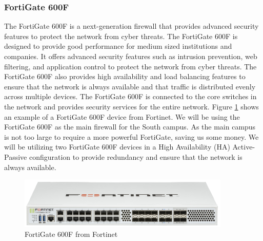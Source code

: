\documentclass[12pt]{report}
\begin{document}
\subsubsection{FortiGate 600F}
The FortiGate 600F is a next-generation firewall that provides advanced security features to protect the network from cyber threats. The FortiGate 600F is designed to provide good performance for medium sized institutions and companies. It offers advanced security features such as intrusion prevention, web filtering, and application control to protect the network from cyber threats. The FortiGate 600F also provides high availability and load balancing features to ensure that the network is always available and that traffic is distributed evenly across multiple devices. The FortiGate 600F is connected to the core switches in the network and provides security services for the entire network. Figure \ref{fig:600F} shows an example of a FortiGate 600F device from Fortinet\cite{600F}. We will be using the FortiGate 600F as the main firewall for the South campus. As the main campus is not too large to require a more powerful FortiGate, saving us some money. We will be utilizing two FortiGate 600F devices in a High Availability (HA) Active-Passive configuration to provide redundancy and ensure that the network is always available.
\begin{figure}[h]
    \centering
    \includegraphics[width=0.9\textwidth]{images/600F.png}
    \caption{FortiGate 600F from Fortinet \cite{600FIMG}}
    \label{fig:600F}
\end{figure}
\end{document}

